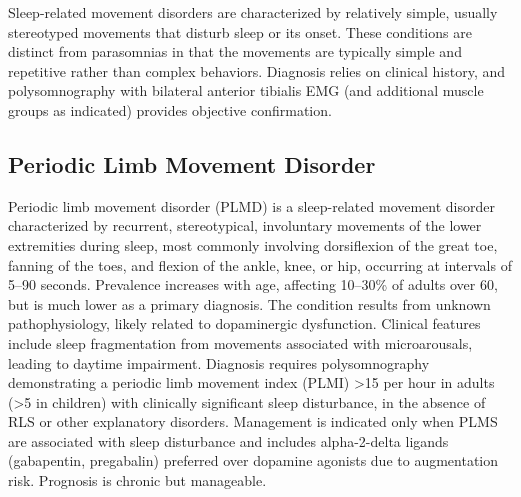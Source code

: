 




\label{sec:Sleep-Related Movement Disorders}

Sleep-related movement disorders are characterized by relatively simple, usually stereotyped movements that disturb sleep or its onset. These conditions are distinct from parasomnias in that the movements are typically simple and repetitive rather than complex behaviors. Diagnosis relies on clinical history, and polysomnography with bilateral anterior tibialis EMG (and additional muscle groups as indicated) provides objective confirmation.

\subsection{Periodic Limb Movement Disorder}
\label{sec:Periodic Limb Movement Disorder}
Periodic limb movement disorder (PLMD) is a sleep-related movement disorder characterized by recurrent, stereotypical, involuntary movements of the lower extremities during sleep, most commonly involving dorsiflexion of the great toe, fanning of the toes, and flexion of the ankle, knee, or hip, occurring at intervals of 5--90 seconds. Prevalence increases with age, affecting 10--30\% of adults over 60, but is much lower as a primary diagnosis. The condition results from unknown pathophysiology, likely related to dopaminergic dysfunction. Clinical features include sleep fragmentation from movements associated with microarousals, leading to daytime impairment. Diagnosis requires polysomnography demonstrating a periodic limb movement index (PLMI) >15 per hour in adults (>5 in children) with clinically significant sleep disturbance, in the absence of RLS or other explanatory disorders. Management is indicated only when PLMS are associated with sleep disturbance and includes alpha-2-delta ligands (gabapentin, pregabalin) preferred over dopamine agonists due to augmentation risk. Prognosis is chronic but manageable.

